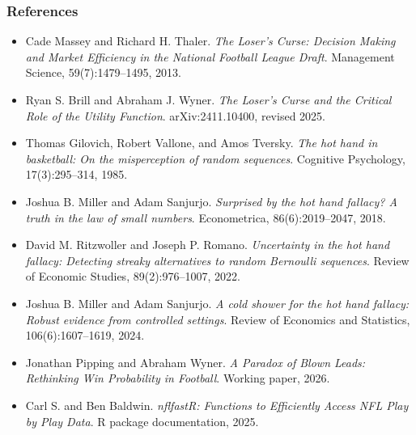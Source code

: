 \documentclass[aspectratio=169,professionalfonts]{beamer}
\begin{document}
\begin{frame}
\frametitle{References}
\footnotesize
\begin{itemize}
  \item Cade Massey and Richard H. Thaler. \emph{The Loser's Curse: Decision Making and Market Efficiency in the National Football League Draft}. Management Science, 59(7):1479--1495, 2013.
  \item Ryan S. Brill and Abraham J. Wyner. \emph{The Loser's Curse and the Critical Role of the Utility Function}. arXiv:2411.10400, revised 2025.
  \item Thomas Gilovich, Robert Vallone, and Amos Tversky. \emph{The hot hand in basketball: On the misperception of random sequences}. Cognitive Psychology, 17(3):295--314, 1985.
  \item Joshua B. Miller and Adam Sanjurjo. \emph{Surprised by the hot hand fallacy? A truth in the law of small numbers}. Econometrica, 86(6):2019--2047, 2018.
  \item David M. Ritzwoller and Joseph P. Romano. \emph{Uncertainty in the hot hand fallacy: Detecting streaky alternatives to random Bernoulli sequences}. Review of Economic Studies, 89(2):976--1007, 2022.
  \item Joshua B. Miller and Adam Sanjurjo. \emph{A cold shower for the hot hand fallacy: Robust evidence from controlled settings}. Review of Economics and Statistics, 106(6):1607--1619, 2024.
  \item Jonathan Pipping and Abraham Wyner. \emph{A Paradox of Blown Leads: Rethinking Win Probability in Football}. Working paper, 2026.
  \item Carl S. and Ben Baldwin. \emph{nflfastR: Functions to Efficiently Access NFL Play by Play Data}. R package documentation, 2025.
\end{itemize}
\end{frame}
\end{document}
